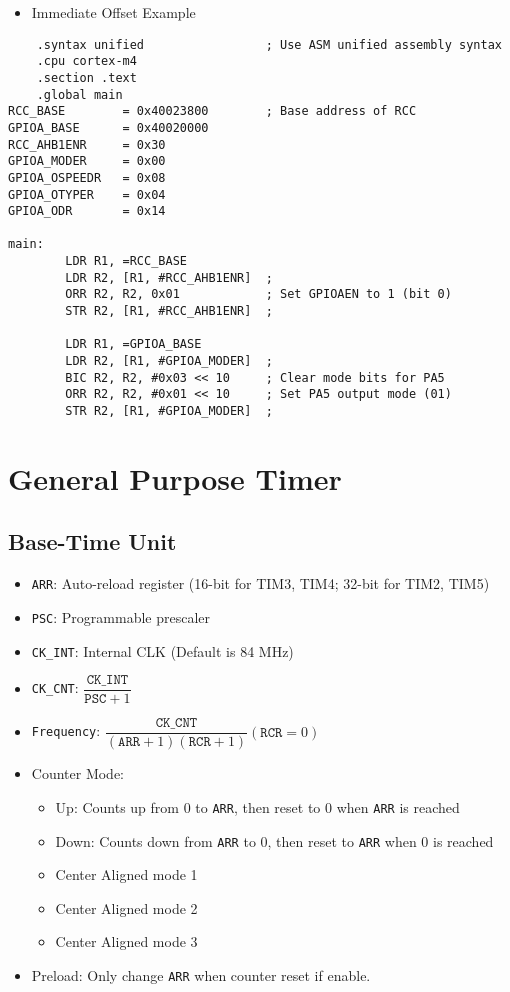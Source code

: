 \documentclass[a4paper,12pt,openany]{book}
\begin{document}
\begin{itemize}
    \item Immediate Offset Example
\end{itemize}
\begin{verbatim}
    .syntax unified                 ; Use ASM unified assembly syntax
    .cpu cortex-m4
    .section .text
    .global main
RCC_BASE        = 0x40023800        ; Base address of RCC 
GPIOA_BASE      = 0x40020000
RCC_AHB1ENR     = 0x30
GPIOA_MODER     = 0x00
GPIOA_OSPEEDR   = 0x08
GPIOA_OTYPER    = 0x04
GPIOA_ODR       = 0x14

main:
        LDR R1, =RCC_BASE
        LDR R2, [R1, #RCC_AHB1ENR]  ;
        ORR R2, R2, 0x01            ; Set GPIOAEN to 1 (bit 0)
        STR R2, [R1, #RCC_AHB1ENR]  ;

        LDR R1, =GPIOA_BASE
        LDR R2, [R1, #GPIOA_MODER]  ; 
        BIC R2, R2, #0x03 << 10     ; Clear mode bits for PA5
        ORR R2, R2, #0x01 << 10     ; Set PA5 output mode (01)
        STR R2, [R1, #GPIOA_MODER]  ;
\end{verbatim}

\chapter{General Purpose Timer}
\section{Base-Time Unit}
\begin{itemize}
    \item \texttt{ARR}: Auto-reload register (16-bit for TIM3, TIM4; 32-bit for TIM2, TIM5)
    \item \texttt{PSC}: Programmable prescaler
    \item \texttt{CK\_INT}: Internal CLK (Default is 84 MHz)
    \item \texttt{CK\_CNT}: $\dfrac{\texttt{CK\_INT}}{\texttt{PSC}+1}$
    \item \texttt{Frequency}: $\dfrac{\texttt{CK\_CNT}}{(\texttt{ARR}+1)(\texttt{RCR}+1)}(\texttt{RCR} = 0)$
    \item Counter Mode:
    \begin{itemize}
        \item Up: Counts up from 0 to \texttt{ARR}, then reset to 0 when \texttt{ARR} is reached
        \item Down: Counts down from \texttt{ARR} to 0, then reset to \texttt{ARR} when 0 is reached
        \item Center Aligned mode 1
        \item Center Aligned mode 2
        \item Center Aligned mode 3
    \end{itemize}
    \item Preload: Only change \texttt{ARR} when counter reset if enable.
\end{itemize}
\end{document}
